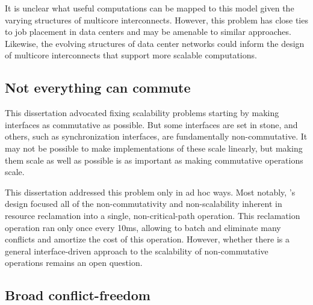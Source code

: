 It is unclear what useful computations can be mapped to this model
given the varying structures of multicore interconnects.  However,
this problem has close ties to job placement in data centers and may
be amenable to similar approaches.
%
Likewise, the evolving structures of data center networks could inform
the design of multicore interconnects that support more scalable
computations.



\subsection{Not everything can commute}

This dissertation advocated fixing scalability problems starting
by making interfaces as commutative as possible.  But some interfaces
are set in stone, and others, such as synchronization interfaces, are
fundamentally non-commutative.  It may not be possible to make
implementations of these scale linearly, but making them scale as well
as possible is as important as making commutative operations scale.

This dissertation addressed this problem only in ad hoc ways.
%
Most notably, 's design focused all of the non-commutativity
and non-scalability inherent in resource reclamation into a single,
non-critical-path operation.
%
This reclamation operation ran only once every 10ms, allowing
 to batch and eliminate many conflicts and amortize the cost
of this operation.
%
However, whether there is a general interface-driven approach to the
scalability of non-commutative operations remains an open question.


\subsection{Broad conflict-freedom}



